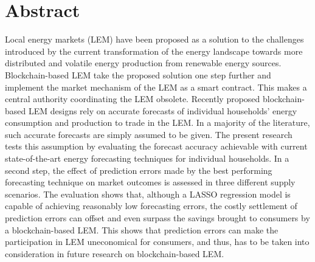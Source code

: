 \section*{Abstract}

Local energy markets (LEM) have been proposed as a solution to the challenges introduced by the current transformation of the energy landscape towards more distributed and volatile energy production from renewable energy sources. Blockchain-based LEM take the proposed solution one step further and implement the market mechanism of the LEM as a smart contract. This makes a central authority coordinating the LEM obsolete. Recently proposed blockchain-based LEM designs rely on accurate forecasts of individual households' energy consumption and production to trade in the LEM. In a majority of the literature, such accurate forecasts are simply assumed to be given. The present research tests this assumption by evaluating the forecast accuracy achievable with current state-of-the-art energy forecasting techniques for individual households. In a second step, the effect of prediction errors made by the best performing forecasting technique on market outcomes is assessed in three different supply scenarios. The evaluation shows that, although a LASSO regression model is capable of achieving reasonably low forecasting errors, the costly settlement of prediction errors can offset and even surpass the savings brought to consumers by a blockchain-based LEM. This shows that prediction errors can make the participation in LEM uneconomical for consumers, and thus, has to be taken into consideration in future research on blockchain-based LEM.

